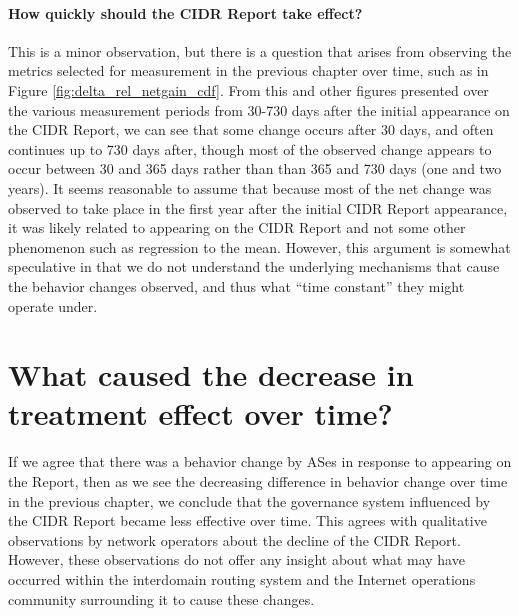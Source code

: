 \paragraph{How quickly should the CIDR Report take effect?}

This is a minor observation, but there is a question that arises from observing
the metrics selected for measurement in the previous chapter over time, such as
in Figure \ref{fig:delta_rel_netgain_cdf}. From this and other figures
presented over the various measurement periods from 30-730 days after the
initial appearance on the CIDR Report, we can see that some change occurs after
30 days, and often continues up to 730 days after, though most of the observed
change appears to occur between 30 and 365 days rather than than 365 and 730
days (one and two years). It seems reasonable to assume that because most of
the net change was observed to take place in the first year after the initial
CIDR Report appearance, it was likely related to appearing on the CIDR Report
and not some other phenomenon such as regression to the mean. However, this
argument is somewhat speculative in that we do not understand the underlying
mechanisms that cause the behavior changes observed, and thus what ``time
constant'' they might operate under.


\section{What caused the decrease in treatment effect over time?}

If we agree that there was a behavior change by ASes in response to appearing
on the Report, then as we see the decreasing difference in behavior change over
time in the previous chapter, we conclude that the governance system influenced
by the CIDR Report became less effective over time. This agrees with
qualitative observations by network operators about the decline of the CIDR
Report. However, these observations do not offer any insight about what may
have occurred within the interdomain routing system and the Internet operations
community surrounding it to cause these changes.

